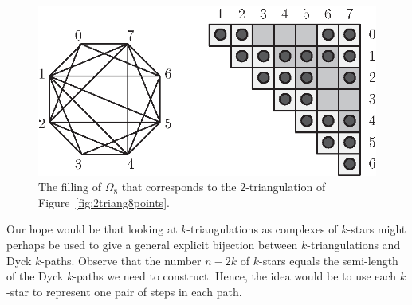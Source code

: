 \documentclass[12pt]{amsart}
\begin{document}
\begin{figure}
\centerline{\includegraphics[scale=1]{polyominoes2.eps}}
\caption{\small{The filling of $\Omega_8$ that corresponds to the $2$-triangulation of Figure~\ref{fig:2triang8points}.}}\label{polyominoes2}
\end{figure}

Our hope would be that looking at $k$-triangulations as complexes of $k$-stars might perhaps be used to give a general explicit bijection between $k$-triangulations and Dyck $k$-paths. Observe that the number $n-2k$ of $k$-stars equals the semi-length of the Dyck $k$-paths we need to construct. Hence, the idea would be to use each $k$-star to represent one pair of steps in each path.





\end{document}
